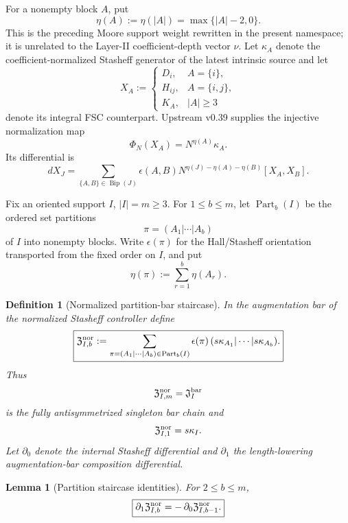 \documentclass[11pt]{article}
\newtheorem{lemma}[theorem]{Lemma}
\newtheorem{definition}[theorem]{Definition}
\theoremstyle{remark}
\begin{document}
For a nonempty block \(A\), put
\[
 \eta(A):=\eta(|A|)=\max\{|A|-2,0\}.
\]
This is the preceding Moore support weight rewritten in the present namespace;
it is unrelated to the Layer-II coefficient-depth vector $\nu$.
Let \(\kappa_A\) denote the coefficient-normalized Stasheff generator of the
latest intrinsic source and let
\[
 X_A:=
 \begin{cases}
 D_i,&A=\{i\},\\
 H_{ij},&A=\{i,j\},\\
 K_A,&|A|\ge3
 \end{cases}
\]
denote its integral FSC counterpart.  Upstream v0.39 supplies the injective
normalization map
\begin{equation}
 \boxed{
 \Phi_N(X_A)=N^{\eta(A)}\kappa_A.}
\end{equation}
Its differential is
\begin{equation}
 dX_J
 =
 \sum_{\{A,B\}\in\operatorname{Bip}(J)}
 \epsilon(A,B)
 N^{\eta(J)-\eta(A)-\eta(B)}
 [X_A,X_B].
\end{equation}

Fix an oriented support \(I\), \(|I|=m\ge3\).  For \(1\le b\le m\), let
\(\operatorname{Part}_b(I)\) be the ordered set partitions
\[
 \pi=(A_1|\cdots|A_b)
\]
of \(I\) into nonempty blocks.  Write \(\epsilon(\pi)\) for the Hall/Stasheff
orientation transported from the fixed order on \(I\), and put
\[
 \eta(\pi):=\sum_{r=1}^b\eta(A_r).
\]

\begin{definition}[Normalized partition-bar staircase]
\label{P2M-def:v27-normalized-partition-staircase}
In the augmentation bar of the normalized Stasheff controller define
\begin{equation}
 \boxed{
 \mathfrak Z^{\rm nor}_{I,b}
 :=
 \sum_{\pi=(A_1|\cdots|A_b)\in\operatorname{Part}_b(I)}
 \epsilon(\pi)\,
 (s\kappa_{A_1}|\cdots|s\kappa_{A_b}).}
\end{equation}
Thus
\[
 \mathfrak Z^{\rm nor}_{I,m}
 =
 \mathfrak J_I^{\rm bar}
\]
is the fully antisymmetrized singleton bar chain and
\[
 \mathfrak Z^{\rm nor}_{I,1}=s\kappa_I.
\]
Let \(\partial_0\) denote the internal Stasheff differential and
\(\partial_1\) the length-lowering augmentation-bar composition differential.
\end{definition}

\begin{lemma}[Partition staircase identities]
\label{P2M-lem:v27-normalized-staircase-identities}
For \(2\le b\le m\),
\begin{equation}
 \boxed{
 \partial_1\mathfrak Z^{\rm nor}_{I,b}
 =
 -\,\partial_0\mathfrak Z^{\rm nor}_{I,b-1}.}
\end{equation}
\end{lemma}
\end{document}
